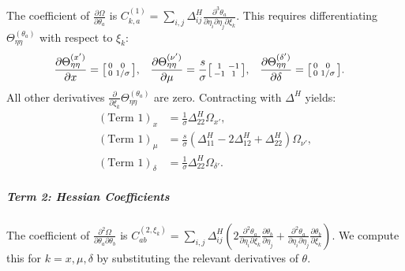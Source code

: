 \documentclass{article}
\begin{document}
The coefficient of $\frac{\partial \Omega}{\partial \theta_a}$ is $C^{(1)}_{k,a} = \sum_{i,j} \Delta^H_{ij} \frac{\partial^3 \theta_a}{\partial \eta_i \partial \eta_j \partial \xi_k}$.
This requires differentiating $\Theta_{\eta\eta}^{(\theta_a)}$ with respect to $\xi_k$:
%
\begin{align}
  \frac{\partial \Theta_{\eta\eta}^{(x')}}{\partial x}           & = \begin{bsmallmatrix} 0 & 0 \\ 0 & 1/\sigma \end{bsmallmatrix},                  &
  \frac{\partial \Theta_{\eta\eta}^{(\nu')}}{\partial \mu}       & = \frac{s}{\sigma} \begin{bsmallmatrix} 1 & -1 \\ -1 & 1 \end{bsmallmatrix}, &
  \frac{\partial \Theta_{\eta\eta}^{(\delta')}}{\partial \delta} & = \begin{bsmallmatrix} 0 & 0 \\ 0 & 1/\sigma \end{bsmallmatrix}.
\end{align}
%
All other derivatives $\frac{\partial}{\partial \xi_k} \Theta_{\eta\eta}^{(\theta_a)}$ are zero.
Contracting with $\Delta^H$ yields:
%
\begin{align}
  (\text{Term 1})_x      & = \frac{1}{\sigma} \Delta^H_{22} \Omega_{x'},                                      \\
  (\text{Term 1})_\mu    & = \frac{s}{\sigma} (\Delta^H_{11} - 2\Delta^H_{12} + \Delta^H_{22}) \Omega_{\nu'}, \\
  (\text{Term 1})_\delta & = \frac{1}{\sigma} \Delta^H_{22} \Omega_{\delta'}.
\end{align}

\subparagraph{Term 2: Hessian Coefficients}

The coefficient of $\frac{\partial^2 \Omega}{\partial \theta_a \partial \theta_b}$ is $C^{(2,\xi_k)}_{ab} = \sum_{i,j} \Delta^H_{ij} ( 2 \frac{\partial^2 \theta_a}{\partial \eta_i \partial \xi_k} \frac{\partial \theta_b}{\partial \eta_j} + \frac{\partial^2 \theta_a}{\partial \eta_i \partial \eta_j} \frac{\partial \theta_b}{\partial \xi_k} )$.
We compute this for $k=x, \mu, \delta$ by substituting the relevant derivatives of $\theta$.
\end{document}
